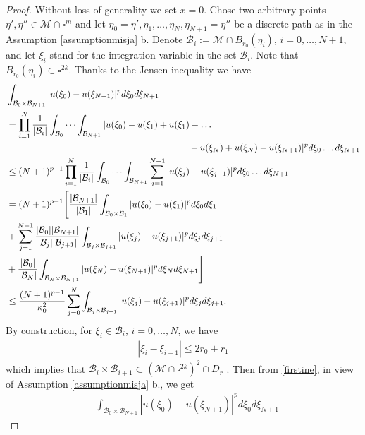 \documentclass[11pt]{article}
\def\M{\mathcal{M}}
\theoremstyle{remark}
\begin{document}
\begin{appendices}
\begin{proof}
	Without loss of generality we set $x=0$. Chose two arbitrary points  $\eta', \eta'' \in \M\cap \square^m$ and let $\eta_0=\eta', \eta_1, \dots, \eta_N, \eta_{N+1}=\eta''$ be a discrete path as in the Assumption \ref{assumptionmisja} b. Denote $\mathcal B_i :=\M\cap B_{r_0}(\eta_i)$, $i=0,\dots,N+1$, and let $\xi_i$ stand for the integration variable in the set $\mathcal B_i$. Note that $B_{r_0}(\eta_i)\subset \square^{2k}$. Thanks to the Jensen inequality we have
	\begin{align}
		&\int_{\mathcal B_0\times \mathcal B_{N+1}} |u(\xi_0)-u(\xi_{N+1})|^pd\xi_0d\xi_{N+1} \notag\\
		&=\prod_{i=1}^N \frac{1}{|\mathcal B_i|} \int_{\mathcal B_0} \cdots \int_{\mathcal B_{N+1}} |u(\xi_0)-u(\xi_1)+u(\xi_1)-\dots\notag\\ &\hspace{7cm}-u(\xi_N)+u(\xi_N)-u(\xi_{N+1})|^pd\xi_0 \dots d\xi_{N+1} \notag\\
		&\leq (N+1)^{p-1}\prod_{i=1}^N \frac{1}{|\mathcal B_i|} \int_{\mathcal B_0} \cdots \int_{\mathcal B_{N+1}} \sum_{j=1}^{N+1}|u(\xi_j)-u(\xi_{j-1})|^p d\xi_0 \dots d\xi_{N+1}\notag\\
		&=(N+1)^{p-1}\Bigg[ \frac{|\mathcal B_{N+1}|}{|\mathcal B_{1}|} \int_{\mathcal B_0 \times \mathcal B_1} |u(\xi_0)-u(\xi_1)|^p d\xi_0d\xi_1 \notag
		\\
		&+ \sum_{j=1}^{N-1}\frac{|\mathcal B_0||\mathcal B_{N+1}|}{|\mathcal B_{j}||\mathcal B_{j+1}|} \int_{\mathcal B_j \times \mathcal B_{j+1}} |u(\xi_j)-u(\xi_{j+1})|^p d\xi_j d\xi_{j+1}\notag
		\\
		&+\frac{|\mathcal B_{0}|}{|\mathcal B_{N}|} \int_{\mathcal B_N \times \mathcal B_{N+1}} |u(\xi_N)-u(\xi_{N+1})|^p d\xi_N d\xi_{N+1} \Bigg]\notag
		\\
		&\le \frac{(N+1)^{p-1} }{\kappa_0^2}\sum_{j=0}^{N} \int_{\mathcal B_j \times \mathcal B_{j+1}} |u(\xi_j)-u(\xi_{j+1})|^p d\xi_j d\xi_{j+1}.\label{firstine}
	\end{align}
	By construction, for $\xi_i \in \mathcal B_i$, $i=0,\dots,N$,   we have
	\begin{align*}
		|\xi_i-\xi_{i+1}|  \le 2r_0+r_1
	\end{align*}
	which implies that $\mathcal B_i\times \mathcal B_{i+1} \subset (\M \cap \square^{2k})^2\cap D_r $ . Then from \eqref{firstine}, in view of Assumption \eqref{assumptionmisja} b., we get
	\begin{align*}
		& \int_{\mathcal B_0\times \mathcal B_{N+1}} |u(\xi_0)-u(\xi_{N+1})|^pd\xi_0d\xi_{N+1}

\end{align*}
\end{proof}
\end{appendices}
\end{document}
